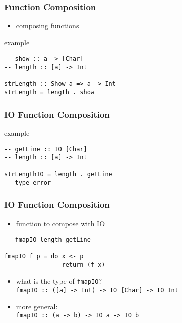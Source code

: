 \documentclass[dvipsnames]{beamer}
\theoremstyle{plain}
\begin{document}
\begin{frame}[fragile]
  \frametitle{Function Composition}

  \begin{itemize}
    \item composing functions
  \end{itemize}

  \begin{exampleblock}{example}
    \begin{lstlisting}
-- show :: a -> [Char]
-- length :: [a] -> Int

strLength :: Show a => a -> Int
strLength = length . show
    \end{lstlisting}
  \end{exampleblock}
\end{frame}

\begin{frame}[fragile]
  \frametitle{IO Function Composition}

  \begin{exampleblock}{example}
    \begin{lstlisting}
-- getLine :: IO [Char]
-- length :: [a] -> Int

strLengthIO = length . getLine
-- type error
    \end{lstlisting}
  \end{exampleblock}
\end{frame}

\begin{frame}[fragile]
  \frametitle{IO Function Composition}

  \begin{itemize}
    \item function to compose with IO
  \end{itemize}

  \begin{exampleblock}{}
    \begin{lstlisting}
-- fmapIO length getLine

fmapIO f p = do x <- p
                return (f x)
    \end{lstlisting}

    \pause
    \medskip
    \begin{itemize}
      \item what is the type of \lstinline|fmapIO|?\\
        \lstinline|fmapIO :: ([a] -> Int) -> IO [Char] -> IO Int|
      \pause
      \smallskip
      \item more general:\\
        \lstinline|fmapIO :: (a -> b) -> IO a -> IO b|
    \end{itemize}
  \end{exampleblock}
\end{frame}
\end{document}
